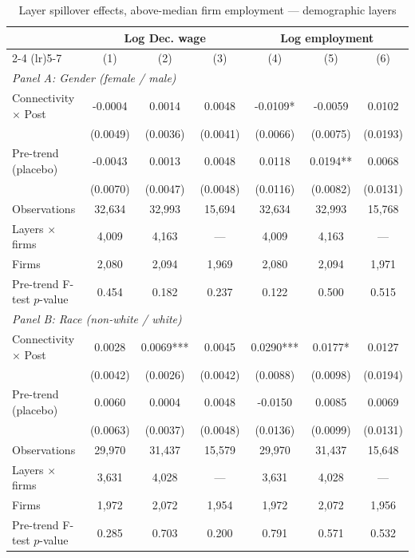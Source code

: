 \begin{table}[H]
\centering
\caption{Layer spillover effects, above-median firm employment --- demographic layers}
\label{tab:layer_specs_abvmed_firm_demog}
\scriptsize
\begin{threeparttable}
\begin{tabular}{lcccccc}
\toprule\toprule
 & \multicolumn{3}{c}{Log Dec. wage} & \multicolumn{3}{c}{Log employment} \\
\cmidrule(lr){2-4} \cmidrule(lr){5-7}
 & (1) & (2) & (3) & (4) & (5) & (6) \\
\midrule
\multicolumn{7}{l}{\textit{Panel A: Gender (female / male)}} \\
\quad Connectivity $\times$ Post & -0.0004 & 0.0014 & 0.0048 & -0.0109* & -0.0059 & 0.0102 \\
 & (0.0049) & (0.0036) & (0.0041) & (0.0066) & (0.0075) & (0.0193) \\
\quad Pre-trend (placebo) & -0.0043 & 0.0013 & 0.0048 & 0.0118 & 0.0194** & 0.0068 \\
 & (0.0070) & (0.0047) & (0.0048) & (0.0116) & (0.0082) & (0.0131) \\
\quad Observations & 32,634 & 32,993 & 15,694 & 32,634 & 32,993 & 15,768 \\
\quad Layers $\times$ firms & 4,009 & 4,163 & --- & 4,009 & 4,163 & --- \\
\quad Firms & 2,080 & 2,094 & 1,969 & 2,080 & 2,094 & 1,971 \\
\quad Pre-trend F-test $p$-value & 0.454 & 0.182 & 0.237 & 0.122 & 0.500 & 0.515 \\[6pt]
\multicolumn{7}{l}{\textit{Panel B: Race (non-white / white)}} \\
\quad Connectivity $\times$ Post & 0.0028 & 0.0069*** & 0.0045 & 0.0290*** & 0.0177* & 0.0127 \\
 & (0.0042) & (0.0026) & (0.0042) & (0.0088) & (0.0098) & (0.0194) \\
\quad Pre-trend (placebo) & 0.0060 & 0.0004 & 0.0048 & -0.0150 & 0.0085 & 0.0069 \\
 & (0.0063) & (0.0037) & (0.0048) & (0.0136) & (0.0099) & (0.0131) \\
\quad Observations & 29,970 & 31,437 & 15,579 & 29,970 & 31,437 & 15,648 \\
\quad Layers $\times$ firms & 3,631 & 4,028 & --- & 3,631 & 4,028 & --- \\
\quad Firms & 1,972 & 2,072 & 1,954 & 1,972 & 2,072 & 1,956 \\
\quad Pre-trend F-test $p$-value & 0.285 & 0.703 & 0.200 & 0.791 & 0.571 & 0.532 \\

\end{tabular}
\end{threeparttable}
\end{table}
